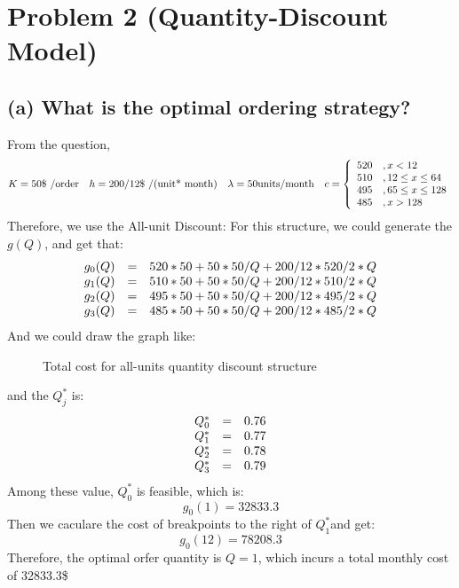 \documentclass[a4paper,12pt]{journal}
\begin{document}
	\section*{Problem 2 (Quantity-Discount Model)}
	\subsection*{(a) What is the optimal ordering strategy?}
	From the question, 
	\begin{equation}
		K=50\text{\$ /order}\quad h=200/12\text{\$ /(unit* month)}\quad \lambda=50\text{units/month}\quad c=\left\{\begin{array}{l l}
				520&, x<12\\
				510&, 12\leq x\leq 64\\
				495&, 65\leq x\leq 128\\
				485&, x>128\\
		\end{array}\right.
	\end{equation}
	Therefore, we use the All-unit Discount:
	For this structure, we could generate the $g(Q)$, and get that:
	\begin{equation}
		\begin{array}{r c l}
			g_0(Q)&=&520*50+50*50/Q+200/12*520/2*Q\\
			g_1(Q)&=&510*50+50*50/Q+200/12*510/2*Q\\
			g_2(Q)&=&495*50+50*50/Q+200/12*495/2*Q\\
			g_3(Q)&=&485*50+50*50/Q+200/12*485/2*Q\\
		\end{array}
	\end{equation}
	And we could draw the graph like:
	\begin{figure}[h]
		\caption{Total cost for all-units quantity discount structure}
	\end{figure}
	and the $Q_j^\ast$ is:
	\begin{equation}
		\begin{array}{r c l}
			Q_0^\ast&=&0.76\\
			Q_1^\ast&=&0.77\\
			Q_2^\ast&=&0.78\\
			Q_3^\ast&=&0.79\\
		\end{array}
	\end{equation}
	Among these value, $Q_0^\ast$ is feasible, which is:
	$$g_0(1)=32833.3$$
	Then we caculare the cost of breakpoints to the right of $Q_1^\ast$and get:\\
	$$g_0(12)=78208.3$$
	Therefore, the optimal orfer quantity is $Q=1$, which incurs a total monthly cost of 32833.3\$
\end{document}
